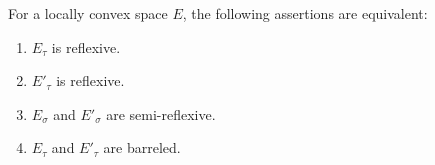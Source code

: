 For a locally convex space $E$, the following assertions are equivalent:
\begin{enumerate}
\item[(a)] $E_\tau$ is reflexive.
\item[(b)] $E'_\tau$ is reflexive.
\item[(c)] $E_\sigma$ and $E'_\sigma$ are semi-reflexive.
\item[(d)] $E_\tau$ and $E'_\tau$ are barreled.
\end{enumerate}
